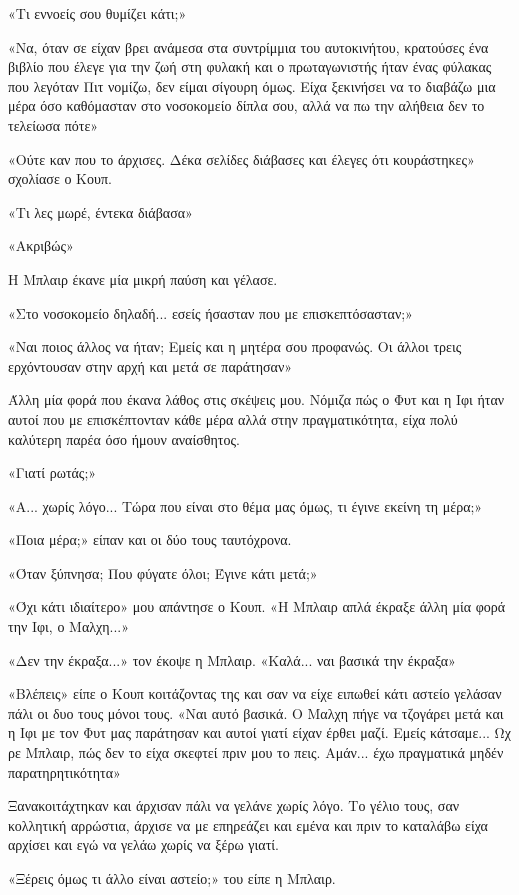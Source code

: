 \documentclass[12pt,twoside, openany]{book}
\begin{document}
«Τι εννοείς σου θυμίζει κάτι;»

«Να, όταν σε είχαν βρει ανάμεσα στα συντρίμμια του αυτοκινήτου, κρατούσες ένα βιβλίο που έλεγε για την ζωή στη φυλακή και ο πρωταγωνιστής ήταν ένας φύλακας που λεγόταν Πιτ νομίζω, δεν είμαι σίγουρη όμως. Είχα ξεκινήσει να το διαβάζω μια μέρα όσο καθόμασταν στο νοσοκομείο δίπλα σου, αλλά να πω την αλήθεια δεν το τελείωσα πότε»

«Ούτε καν που το άρχισες. Δέκα σελίδες διάβασες και έλεγες ότι κουράστηκες» σχολίασε ο Κουπ.

«Τι λες μωρέ, έντεκα διάβασα»

«Ακριβώς»

Η Μπλαιρ έκανε μία μικρή παύση και γέλασε.

«Στο νοσοκομείο δηλαδή... εσείς ήσασταν που με επισκεπτόσασταν;»

«Ναι ποιος άλλος να ήταν; Εμείς και η μητέρα σου προφανώς. Οι άλλοι τρεις ερχόντουσαν στην αρχή και μετά σε παράτησαν»

Άλλη μία φορά που έκανα λάθος στις σκέψεις μου. Νόμιζα πώς ο Φυτ και η Ιφι ήταν αυτοί που με επισκέπτονταν κάθε μέρα αλλά στην πραγματικότητα, είχα πολύ καλύτερη παρέα όσο ήμουν αναίσθητος.

«Γιατί ρωτάς;»

«Α... χωρίς λόγο... Τώρα που είναι στο θέμα μας όμως, τι έγινε εκείνη τη μέρα;»

«Ποια μέρα;» είπαν και οι δύο τους ταυτόχρονα.

«Όταν ξύπνησα; Που φύγατε όλοι; Έγινε κάτι μετά;»

«Όχι κάτι ιδιαίτερο» μου απάντησε ο Κουπ. «Η Μπλαιρ απλά έκραξε άλλη μία φορά την Ιφι, ο Μαλχη...»

«Δεν την έκραξα...» τον έκοψε η Μπλαιρ. «Καλά... ναι βασικά την έκραξα»

«Βλέπεις» είπε ο Κουπ κοιτάζοντας της και σαν να είχε ειπωθεί κάτι αστείο γελάσαν πάλι οι δυο τους μόνοι τους. «Ναι αυτό βασικά. Ο Μαλχη πήγε να τζογάρει μετά και η Ιφι με τον Φυτ μας παράτησαν και αυτοί γιατί είχαν έρθει μαζί. Εμείς κάτσαμε... Ωχ ρε Μπλαιρ, πώς δεν το είχα σκεφτεί πριν μου το πεις. Αμάν... έχω πραγματικά μηδέν παρατηρητικότητα»

Ξανακοιτάχτηκαν και άρχισαν πάλι να γελάνε χωρίς λόγο. Το γέλιο τους, σαν κολλητική αρρώστια, άρχισε να με επηρεάζει και εμένα και πριν το καταλάβω είχα αρχίσει και εγώ να γελάω χωρίς να ξέρω γιατί.

«Ξέρεις όμως τι άλλο είναι αστείο;» του είπε η Μπλαιρ.
\end{document}
